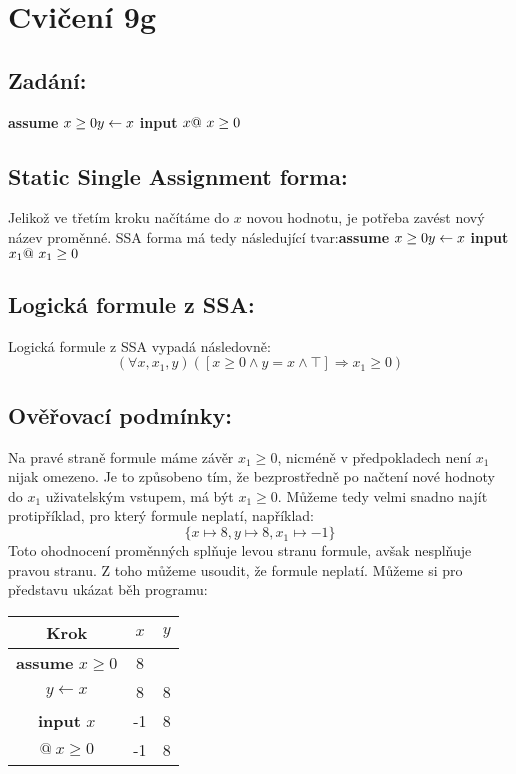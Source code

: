 \documentclass{article}
\begin{document}
\section{Cvičení 9g}

\subsection{Zadání:}
\textbf{assume} $x \geq 0 \newline y \leftarrow x \newline$ \textbf{input} $x \newline @ \ x \geq 0$

\subsection{Static Single Assignment forma:}
Jelikož ve třetím kroku načítáme do $x$ novou hodnotu, je potřeba zavést nový název proměnné. SSA forma má tedy následující tvar:\newline\newline \textbf{assume} $x \geq 0 \newline y \leftarrow x \newline $ \textbf{input} $ x_1  \newline @ \ x_1 \geq 0$

\subsection{Logická formule z SSA:}
Logická formule z SSA vypadá následovně:
$$ (\forall x, x_1, y)([x \geq 0 \wedge y = x \wedge \top] \Rightarrow x_1 \geq 0) $$

\subsection{Ověřovací podmínky:}
Na pravé straně formule máme závěr $x_1 \geq 0$, nicméně v předpokladech není $x_1$ nijak omezeno. Je to způsobeno tím, že bezprostředně po načtení nové hodnoty do $x_1$ uživatelským vstupem, má být $x_1 \geq 0$. Můžeme tedy velmi snadno najít protipříklad, pro který formule neplatí, například:$$\{x \mapsto 8, y \mapsto 8, x_1 \mapsto -1 \}$$
Toto ohodnocení proměnných splňuje levou stranu formule, avšak nesplňuje pravou stranu. Z toho můžeme usoudit, že formule neplatí. Můžeme si pro představu ukázat běh programu:

\begin{table}[H]\centering

\begin{tabular}{|c|c|c|}
    
        \hline \textbf{Krok} & $x$ & $y$ \\ \hline \hline
        \textbf{assume} $x \geq 0$ & 8 & \\ \hline
        $y \leftarrow x$ & 8 & 8 \\ \hline
        \textbf{input} $x$ & -1 & 8  \\ \hline
        $@ \ x \geq 0$ & -1  & 8  \\ \hline
    	
    	\end{tabular}
\end{table}
\end{document}
